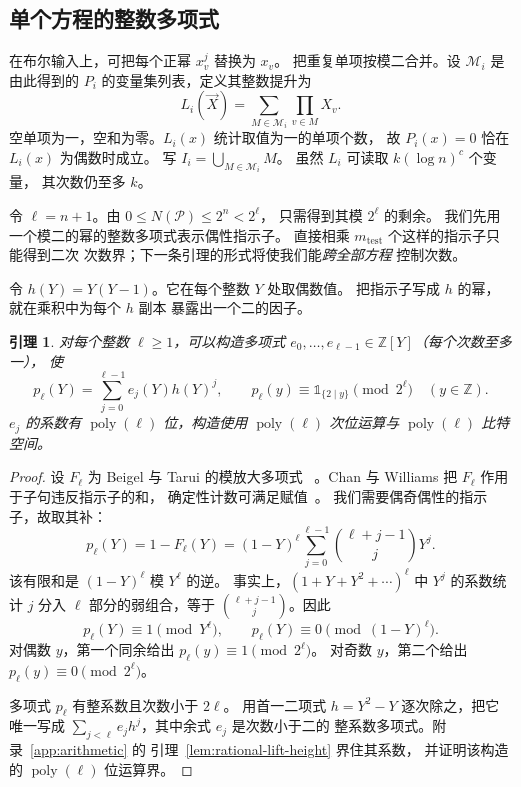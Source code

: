 \documentclass[11pt,reqno]{amsart}
\numberwithin{equation}{section}
\newtheorem{lemma}[theorem]{引理}
\theoremstyle{definition}\newtheorem{definition}[theorem]{定义}
\theoremstyle{remark}\newtheorem{remark}[theorem]{注}
\newcommand{\poly}{\operatorname{poly}}
\renewcommand{\le}{\leqslant}
\renewcommand{\ge}{\geqslant}
\begin{document}
\subsection{单个方程的整数多项式}\label{subsec:rational-lift}
在布尔输入上，可把每个正幂 $x_v^j$ 替换为 $x_v$。
把重复单项按模二合并。设 $\mathcal M_i$ 是由此得到的
$P_i$ 的变量集列表，定义其整数提升为
\[
 L_i(\vec X)=\sum_{M\in\mathcal M_i}\prod_{v\in M}X_v .
\]
空单项为一，空和为零。$L_i(x)$ 统计取值为一的单项个数，
故 $P_i(x)=0$ 恰在 $L_i(x)$ 为偶数时成立。
写 $I_i=\bigcup_{M\in\mathcal M_i}M$。
虽然 $L_i$ 可读取 $k(\log n)^c$ 个变量，
其次数仍至多 $k$。

令 $\ell=n+1$。由 $0\le N(\mathcal P)\le2^n<2^\ell$，
只需得到其模 $2^\ell$ 的剩余。
我们先用一个模二的幂的整数多项式表示偶性指示子。
直接相乘 $m_{\mathrm{test}}$ 个这样的指示子只能得到二次
次数界；下一条引理的形式将使我们能\emph{跨全部方程}
控制次数。

令 $h(Y)=Y(Y-1)$。它在每个整数 $Y$ 处取偶数值。
把指示子写成 $h$ 的幂，就在乘积中为每个 $h$ 副本
暴露出一个二的因子。

\begin{lemma}\label{lem:rational-idempotent}
对每个整数 $\ell\ge1$，可以构造多项式
$e_0,\ldots,e_{\ell-1}\in\mathbb Z[Y]$（每个次数至多一），
使
\begin{equation}\label{eq:idempotent-expansion}
 p_\ell(Y)=\sum_{j=0}^{\ell-1}e_j(Y)h(Y)^j,
 \qquad
 p_\ell(y)\equiv\mathds{1}_{\{2\mid y\}}\pmod{2^\ell}
 \quad(y\in\mathbb Z).
\end{equation}
$e_j$ 的系数有 $\poly(\ell)$ 位，构造使用 $\poly(\ell)$
次位运算与 $\poly(\ell)$ 比特空间。
\end{lemma}
\begin{proof}
设 $F_\ell$ 为 Beigel 与 Tarui 的模放大多项式
~\cite[Section~2.3]{BT94}。Chan 与 Williams
把 $F_\ell$ 作用于子句违反指示子的和，
确定性计数可满足赋值~\cite[Theorem~2.5 and proof of Theorem~1.6]{CW21}。
我们需要偶奇偶性的指示子，故取其补：
\begin{equation}\label{eq:binary-indicator}
 p_\ell(Y)=1-F_\ell(Y)=(1-Y)^\ell
       \sum_{j=0}^{\ell-1}\binom{\ell+j-1}{j}Y^j.
\end{equation}
该有限和是 $(1-Y)^\ell$ 模 $Y^\ell$ 的逆。
事实上，$(1+Y+Y^2+\cdots)^\ell$ 中 $Y^j$ 的系数统计 $j$
分入 $\ell$ 部分的弱组合，等于
$\binom{\ell+j-1}{j}$。因此
\[
 p_\ell(Y)\equiv1\pmod{Y^\ell},
 \qquad
 p_\ell(Y)\equiv0\pmod{(1-Y)^\ell}.
\]
对偶数 $y$，第一个同余给出
$p_\ell(y)\equiv1\pmod{2^\ell}$。
对奇数 $y$，第二个给出 $p_\ell(y)\equiv0\pmod{2^\ell}$。

多项式 $p_\ell$ 有整系数且次数小于 $2\ell$。
用首一二项式 $h=Y^2-Y$ 逐次除之，把它唯一写成
$\sum_{j<\ell}e_jh^j$，其中余式 $e_j$ 是次数小于二的
整系数多项式。附录~\ref{app:arithmetic} 的
引理~\ref{lem:rational-lift-height} 界住其系数，
并证明该构造的 $\poly(\ell)$ 位运算界。
\end{proof}
\end{document}
